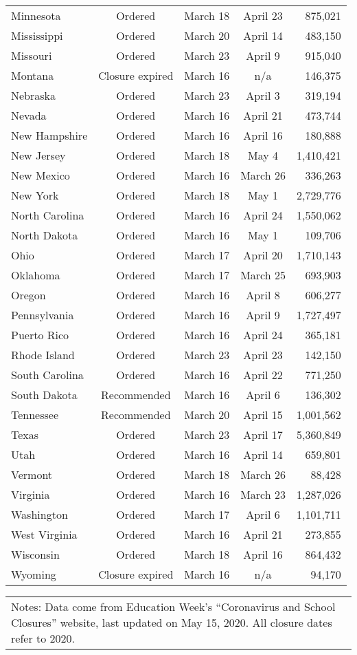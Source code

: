 \begin{table}[htbp]
\begin{tabular*}{1\textwidth}{@{\extracolsep{\fill}}lcccr}
Minnesota	&	Ordered	&	March 18	&	April 23	&	875,021	\\
Mississippi	&	Ordered	&	March 20	&	April 14	&	483,150	\\
Missouri	&	Ordered	&	March 23	&	April 9	&	915,040	\\
Montana	&	Closure expired	&	March 16	&	n/a	&	146,375	\\
Nebraska	&	Ordered	&	March 23	&	April 3	&	319,194	\\
Nevada	&	Ordered	&	March 16	&	April 21	&	473,744	\\
New Hampshire	&	Ordered	&	March 16	&	April 16	&	180,888	\\
New Jersey	&	Ordered	&	March 18	&	May 4	&	1,410,421	\\
New Mexico	&	Ordered	&	March 16	&	March 26	&	336,263	\\
New York	&	Ordered	&	March 18	&	May 1	&	2,729,776	\\
North Carolina	&	Ordered	&	March 16	&	April 24	&	1,550,062	\\
North Dakota	&	Ordered	&	March 16	&	May 1	&	109,706	\\
Ohio	&	Ordered	&	March 17	&	April 20	&	1,710,143	\\
Oklahoma	&	Ordered	&	March 17	&	March 25	&	693,903	\\
Oregon	&	Ordered	&	March 16	&	April 8	&	606,277	\\
Pennsylvania	&	Ordered	&	March 16	&	April 9	&	1,727,497	\\
Puerto Rico	&	Ordered	&	March 16	&	April 24	&	365,181	\\
Rhode Island	&	Ordered	&	March 23	&	April 23	&	142,150	\\
South Carolina	&	Ordered	&	March 16	&	April 22	&	771,250	\\
South Dakota	&	Recommended	&	March 16	&	April 6	&	136,302	\\
Tennessee	&	Recommended	&	March 20	&	April 15	&	1,001,562	\\
Texas	&	Ordered	&	March 23	&	April 17	&	5,360,849	\\
Utah	&	Ordered	&	March 16	&	April 14	&	659,801	\\
Vermont	&	Ordered	&	March 18	&	March 26	&	88,428	\\
Virginia	&	Ordered	&	March 16	&	March 23	&	1,287,026	\\
Washington	&	Ordered	&	March 17	&	April 6	&	1,101,711	\\
West Virginia	&	Ordered	&	March 16	&	April 21	&	273,855	\\
Wisconsin	&	Ordered	&	March 18	&	April 16	&	864,432	\\
Wyoming	&	Closure expired	&	March 16	&	n/a	&	94,170	\\  
\midrule
\end{tabular*}
\begin{tabular*}{1\textwidth}{p{6.4in}}
\footnotesize Notes: Data come from Education Week's ``Coronavirus and School Closures'' website, last updated on May 15, 2020. All closure dates refer to 2020.
\end{tabular*}
\end{table}
